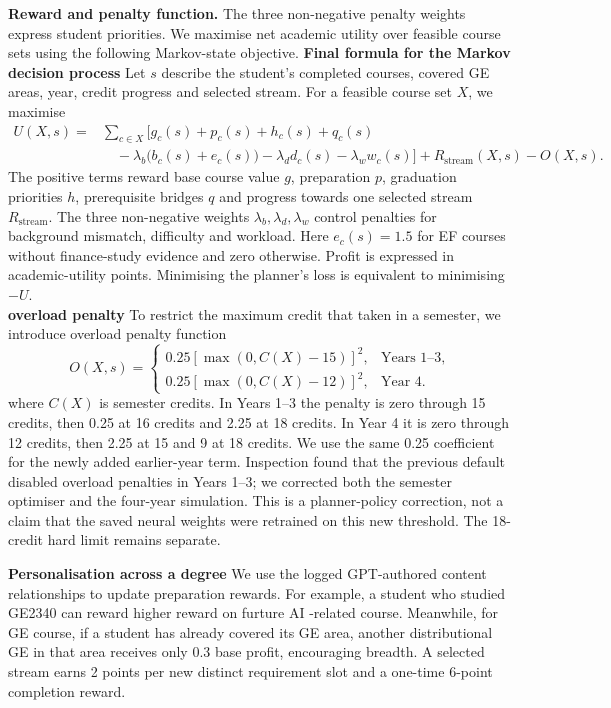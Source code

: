 \documentclass{article}
\begin{document}
\newpage
\textbf{Reward and penalty function.} The three non-negative penalty weights express student priorities. We maximise net academic utility over feasible course sets using the following Markov-state objective.
\textbf{Final formula for the Markov decision process}
Let $s$ describe the student's completed courses, covered GE areas, year, credit progress and selected stream. For a feasible course set $X$, we maximise
\begin{align}
U(X,s)={}&\sum_{c\in X}\bigl[g_c(s)+p_c(s)+h_c(s)+q_c(s)\nonumber\\
&\quad-\lambda_b\bigl(b_c(s)+e_c(s)\bigr)-\lambda_d d_c(s)-\lambda_w w_c(s)\bigr]
+R_{\mathrm{stream}}(X,s)-O(X,s). \label{eq:utility}
\end{align}
The positive terms reward base course value $g$, preparation $p$, graduation priorities $h$, prerequisite bridges $q$ and progress towards one selected stream $R_{\mathrm{stream}}$. The three non-negative weights $\lambda_b,\lambda_d,\lambda_w$ control penalties for background mismatch, difficulty and workload. Here $e_c(s)=1.5$ for EF courses without finance-study evidence and zero otherwise. Profit is expressed in academic-utility points. Minimising the planner's loss is equivalent to minimising $-U$.
\\\textbf{overload penalty} To restrict the maximum credit that taken in a semester, we introduce overload penalty function
\begin{equation}
O(X,s)=\begin{cases}
0.25[\max(0,C(X)-15)]^2,&\text{Years 1--3},\\
0.25[\max(0,C(X)-12)]^2,&\text{Year 4}.
\end{cases}
\end{equation}
where $C(X)$ is semester credits. In Years 1--3 the penalty is zero through 15 credits, then 0.25 at 16 credits and 2.25 at 18 credits. In Year 4 it is zero through 12 credits, then 2.25 at 15 and 9 at 18 credits. We use the same 0.25 coefficient for the newly added earlier-year term. Inspection found that the previous default disabled overload penalties in Years 1--3; we corrected both the semester optimiser and the four-year simulation. This is a planner-policy correction, not a claim that the saved neural weights were retrained on this new threshold. The 18-credit hard limit remains separate.

\textbf{Personalisation across a degree} We use the logged GPT-authored content relationships to update preparation rewards. For example, a student who studied GE2340 can reward higher reward on furture AI -related course. Meanwhile, for GE course, if a student has already
covered its GE area, another distributional GE in that area receives only 0.3 base profit, encouraging breadth. A selected stream earns 2 points per new distinct requirement slot and a one-time 6-point completion reward. 
\end{document}
